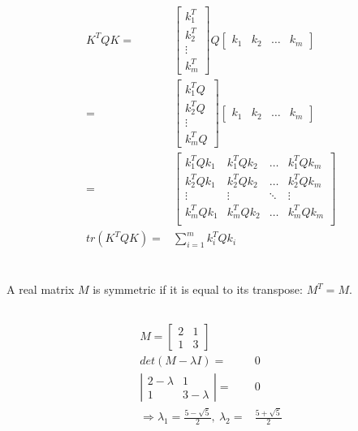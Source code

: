 \documentclass{article}
\begin{document}
\begin{align*}
    K^TQK = &
    \begin{bmatrix}
        k_1^T\\k_2^T\\\vdots\\k_m^T
    \end{bmatrix}
    Q
    \begin{bmatrix}
        k_1 & k_2 & \dots & k_m
    \end{bmatrix}\\
    = &
    \begin{bmatrix}
        k_1^TQ\\k_2^TQ\\\vdots\\k_m^TQ
    \end{bmatrix}
    \begin{bmatrix}
        k_1 & k_2 & \dots & k_m
    \end{bmatrix}\\
    = &
    \begin{bmatrix}
        k_1^TQk_1 & k_1^TQk_2 & \dots & k_1^TQk_m\\
        k_2^TQk_1 & k_2^TQk_2 & \dots & k_2^TQk_m \\
        \vdots & \vdots & \ddots& \vdots\\
        k_m^TQk_1 & k_m^TQk_2 & \dots & k_m^TQk_m\\
    \end{bmatrix}\\
    tr(K^TQK) = &\sum_{i=1}^m k_i^TQk_i
\end{align*}

\section{}

A real matrix $M$ is symmetric if it is equal to its transpose: $M^T = M$.
\subsection{}
\begin{align*}
    M = 
    \begin{bmatrix}
        2 & 1 \\ 1 & 3
    \end{bmatrix}& \\
    det(M - \lambda I) = & 0\\
    \left| 
        \begin{matrix}
            2-\lambda & 1 \\ 1 & 3-\lambda 
        \end{matrix}
    \right|
    = & 0\\
    \Rightarrow \lambda_1 = \frac{5 - \sqrt{5}}{2},\ \lambda_2 =&  \frac{5 + \sqrt{5}}{2}
\end{align*}
\end{document}

